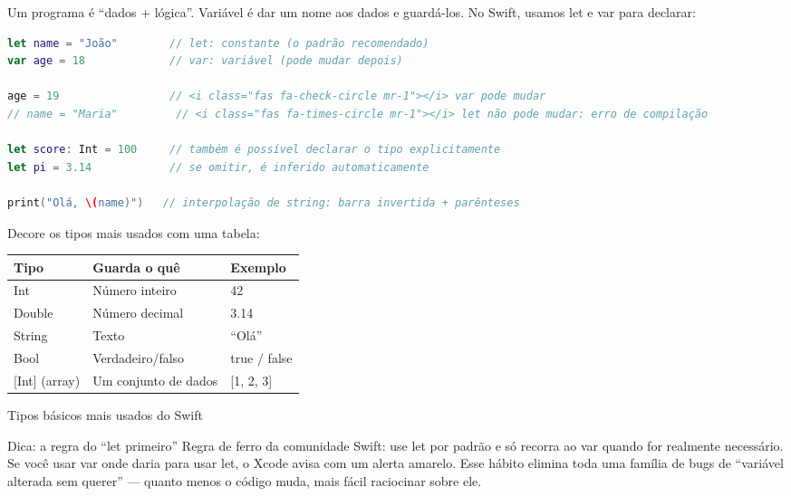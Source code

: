 


Um programa é “dados + lógica”. Variável é dar um nome aos dados e guardá-los. No Swift, usamos let e var para declarar:

\begin{lstlisting}[language=Swift]
let name = "João"        // let: constante (o padrão recomendado)
var age = 18             // var: variável (pode mudar depois)

age = 19                 // <i class="fas fa-check-circle mr-1"></i> var pode mudar
// name = "Maria"         // <i class="fas fa-times-circle mr-1"></i> let não pode mudar: erro de compilação

let score: Int = 100     // também é possível declarar o tipo explicitamente
let pi = 3.14            // se omitir, é inferido automaticamente

print("Olá, \(name)")   // interpolação de string: barra invertida + parênteses
\end{lstlisting}

Decore os tipos mais usados com uma tabela:

\begin{center}
\begin{tabularx}{\linewidth}{|X|X|X|}
\hline
\textbf{Tipo} & \textbf{Guarda o quê} & \textbf{Exemplo} \tabularnewline
\hline
Int & Número inteiro & 42 \tabularnewline
Double & Número decimal & 3.14 \tabularnewline
String & Texto & “Olá” \tabularnewline
Bool & Verdadeiro/falso & true / false \tabularnewline
{}[Int] (array) & Um conjunto de dados & {}[1, 2, 3] \tabularnewline
\hline
\end{tabularx}
\end{center}

\begin{center}\small\color{gray}Tipos básicos mais usados do Swift\end{center}

\begin{tcbinfo}{Dica: a regra do “let primeiro”}
Regra de ferro da comunidade Swift: use let por padrão e só recorra ao var quando for realmente necessário. Se você usar var onde daria para usar let, o Xcode avisa com um alerta amarelo. Esse hábito elimina toda uma família de bugs de “variável alterada sem querer” — quanto menos o código muda, mais fácil raciocinar sobre ele.

\end{tcbinfo}

